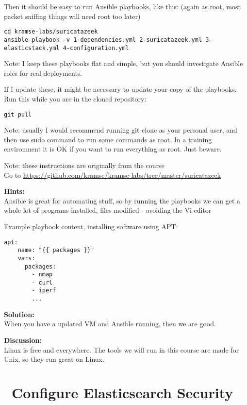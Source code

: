\documentclass[a4paper,11pt,notitlepage]{report}
\begin{document}
Then it should be easy to run Ansible playbooks, like this: (again as root, most packet sniffing things will need root too later)

\begin{verbatim}
cd kramse-labs/suricatazeek
ansible-playbook -v 1-dependencies.yml 2-suricatazeek.yml 3-elasticstack.yml 4-configuration.yml
\end{verbatim}

Note: I keep these playbooks flat and simple, but you should investigate Ansible roles for real deployments.

If I update these, it might be necessary to update your copy of the playbooks. Run this while you are in the cloned repository:

\begin{verbatim}
git pull
\end{verbatim}

Note: usually I would recommend running git clone as your personal user, and then use sudo command to run some commands as root. In a training environment it is OK if you want to run everything as root. Just beware.

Note: these instructions are originally from the course\\
Go to \url{https://github.com/kramse/kramse-labs/tree/master/suricatazeek}

{\bf Hints:}\\
Ansible is great for automating stuff, so by running the playbooks we can get a whole lot of programs installed, files modified - avoiding the Vi editor \smiley

Example playbook content, installing software using APT:
\begin{verbatim}
apt:
    name: "{{ packages }}"
    vars:
      packages:
        - nmap
        - curl
        - iperf
        ...
\end{verbatim}

{\bf Solution:}\\
When you have a updated VM and Ansible running, then we are good.

{\bf Discussion:}\\
Linux is free and everywhere. The tools we will run in this course are made for Unix, so they run great on Linux.

\chapter{\faInfoCircle\ Configure Elasticsearch Security}
\label{ex:xpack-security}
\end{document}
